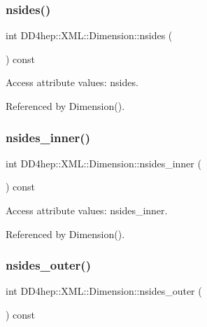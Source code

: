 \subsubsection{\texorpdfstring{nsides()}{nsides()}}
{\footnotesize\ttfamily int D\+D4hep\+::\+X\+M\+L\+::\+Dimension\+::nsides (\begin{DoxyParamCaption}{ }\end{DoxyParamCaption}) const}



Access attribute values\+: nsides. 



Referenced by Dimension().

\hypertarget{struct_d_d4hep_1_1_x_m_l_1_1_dimension_a514ed104814c4125cf1acfd78985c208}{}\label{struct_d_d4hep_1_1_x_m_l_1_1_dimension_a514ed104814c4125cf1acfd78985c208} 
\subsubsection{\texorpdfstring{nsides\+\_\+inner()}{nsides\_inner()}}
{\footnotesize\ttfamily int D\+D4hep\+::\+X\+M\+L\+::\+Dimension\+::nsides\+\_\+inner (\begin{DoxyParamCaption}{ }\end{DoxyParamCaption}) const}



Access attribute values\+: nsides\+\_\+inner. 



Referenced by Dimension().

\hypertarget{struct_d_d4hep_1_1_x_m_l_1_1_dimension_ad7f9c1769d77fe088a46463822d36319}{}\label{struct_d_d4hep_1_1_x_m_l_1_1_dimension_ad7f9c1769d77fe088a46463822d36319} 
\subsubsection{\texorpdfstring{nsides\+\_\+outer()}{nsides\_outer()}}
{\footnotesize\ttfamily int D\+D4hep\+::\+X\+M\+L\+::\+Dimension\+::nsides\+\_\+outer (\begin{DoxyParamCaption}{ }\end{DoxyParamCaption}) const}



